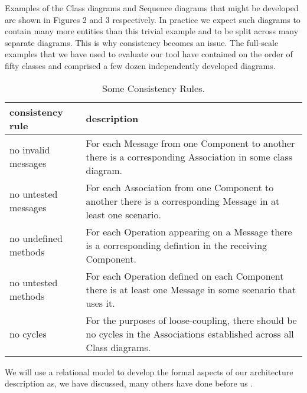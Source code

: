 \documentclass[times, 10pt,twocolumn]{article}
\begin{document}
Examples of the Class diagrams and Sequence diagrams that might be developed are shown in Figures 2 and 3 respectively. In practice we expect such diagrams to contain many more entities than this trivial example and to be split across many separate diagrams. This is why consistency becomes an issue. The full-scale examples that we have used to evaluate our tool have contained on the order of fifty classes and comprised a few dozen independently developed diagrams.
\begin{table}
\begin{tabular}{|l|l|} \hline
consistency rule & description \\ \hline
no invalid messages & \parbox{1.75in}{\vspace{1mm}For each Message from one Component to another there is a corresponding Association in some class diagram.\vspace{1mm}} \\ \hline

no untested messages & \parbox{1.75in}{\vspace{1mm}For each Association from one Component to another there is a corresponding Message in at least one scenario.\vspace{1mm}} \\ \hline

no undefined methods & \parbox{1.75in}{\vspace{1mm}For each Operation appearing on a Message there is a corresponding defintion in the receiving Component.\vspace{1mm}}  \\ \hline

no untested methods & \parbox{1.75in}{\vspace{1mm}For each Operation defined on each Component there is at least one Message in some scenario that uses it.\vspace{1mm}} \\ \hline

no cycles & \parbox{1.75in}{\vspace{1mm}For the purposes of loose-coupling, there should be no cycles in the Associations established across all Class diagrams.\vspace{1mm}} \\ \hline
\end{tabular}
\caption{Some Consistency Rules.}
\end{table}

We will use a relational model to develop the formal aspects of our architecture description as, we have discussed, many others have done before us \cite{Crocopat2,Egyed2,Holt,Alloy,Sabetzadeh07consistencychecking}. 
\end{document}
